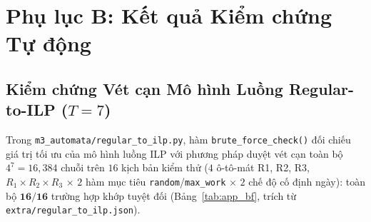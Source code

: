 \section{Phụ lục B: Kết quả Kiểm chứng Tự động}

\subsection{Kiểm chứng Vét cạn Mô hình Luồng Regular-to-ILP (\texorpdfstring{$T = 7$}{T = 7})}
Trong \texttt{m3\_\allowbreak automata/\allowbreak regular\_\allowbreak to\_\allowbreak ilp.py}, hàm \texttt{brute\_\allowbreak force\_\allowbreak check()} đối chiếu giá trị tối ưu của mô hình luồng ILP với phương pháp duyệt vét cạn toàn bộ $4^7 = 16{,}384$ chuỗi trên $16$ kịch bản kiểm thử ($4$ ô-tô-mát R1, R2, R3, $R_1\times R_2\times R_3$ $\times$ $2$ hàm mục tiêu \texttt{random}/\texttt{max\_work} $\times$ $2$ chế độ cố định ngày): toàn bộ $\mathbf{16/16}$ trường hợp khớp tuyệt đối (Bảng~\ref{tab:app_bf}, trích từ \texttt{extra/\allowbreak regular\_\allowbreak to\_\allowbreak ilp.json}).

